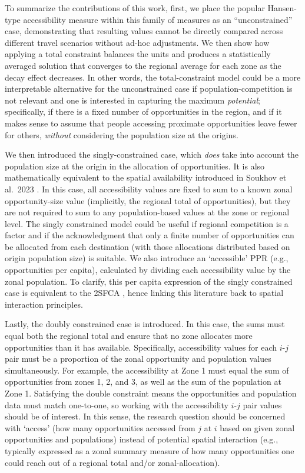 \documentclass[
  10pt,
  letterpaper,
]{article}
\begin{document}
To summarize the contributions of this work, first, we place the popular
Hansen-type accessibility measure \citep{hansen1959} within this family
of measures as an ``unconstrained'' case, demonstrating that resulting
values cannot be directly compared across different travel scenarios
without ad-hoc adjustments. We then show how applying a total constraint
balances the units and produces a statistically averaged solution that
converges to the regional average for each zone as the decay effect
decreases. In other words, the total-constraint model could be a more
interpretable alternative for the unconstrained case if
population-competition is not relevant and one is interested in
capturing the maximum \emph{potential}; specifically, if there is a
fixed number of opportunities in the region, and if it makes sense to
assume that people accessing proximate opportunities leave fewer for
others, \emph{without} considering the population size at the origins.

We then introduced the singly-constrained case, which \emph{does} take
into account the population size at the origin in the allocation of
opportunities. It is also mathematically equivalent to the spatial
availability introduced in Soukhov et al.~2023
\citep{soukhovIntroducingSpatialAvailability2023}. In this case, all
accessibility values are fixed to sum to a known zonal opportunity-size
value (implicitly, the regional total of opportunities), but they are
not required to sum to any population-based values at the zone or
regional level. The singly constrained model could be useful if regional
competition is a factor and if the acknowledgment that only a finite
number of opportunities can be allocated from each destination (with
those allocations distributed based on origin population size) is
suitable. We also introduce an `accessible' PPR (e.g., opportunities per
capita), calculated by dividing each accessibility value by the zonal
population. To clarify, this per capita expression of the singly
constrained case is equivalent to the 2SFCA \citep{luo2003, shen1998},
hence linking this literature back to spatial interaction principles.

Lastly, the doubly constrained case is introduced. In this case, the
sums must equal both the regional total and ensure that no zone
allocates more opportunities than it has available. Specifically,
accessibility values for each \(i\)-\(j\) pair must be a proportion of
the zonal opportunity and population values simultaneously. For example,
the accessibility at Zone 1 must equal the sum of opportunities from
zones 1, 2, and 3, as well as the sum of the population at Zone 1.
Satisfying the double constraint means the opportunities and population
data must match one-to-one, so working with the accessibility
\(i\)-\(j\) pair values should be of interest. In this sense, the
research question should be concerned with `access' (how many
opportunities accessed from \(j\) at \(i\) based on given zonal
opportunities and populations) instead of potential spatial interaction
(e.g., typically expressed as a zonal summary measure of how many
opportunities one could reach out of a regional total and/or
zonal-allocation).
\end{document}
